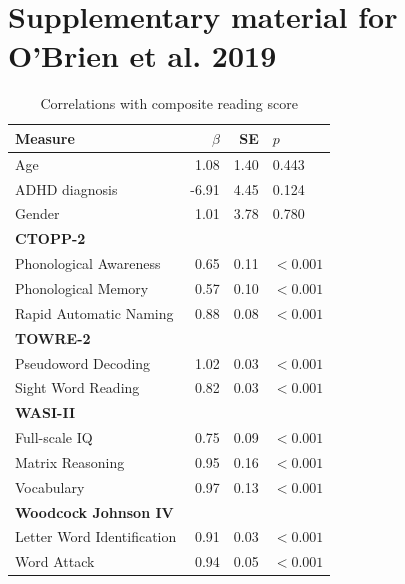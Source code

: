 \documentclass[..\uwthesis.tex]{subfiles}
\begin{document}
\chapter{Supplementary material for O'Brien et al. 2019}

\begin{table}
\centering
\caption{Correlations with composite reading score}
\label{tab:sb_rdcorr}
    \begin{tabular}{lrrl}
    \toprule
     Measure & $\beta$ & SE & $p$\\
    \midrule
    Age                & 1.08 & 1.40 & 0.443\\
    ADHD diagnosis     & -6.91 & 4.45 & 0.124\\
    Gender             & 1.01 & 3.78 & 0.780\\
    \textbf{CTOPP-2} &  &  &  \\
    Phonological Awareness & 0.65 & 0.11 & $< 0.001$\\
    Phonological Memory &0.57 & 0.10 & $< 0.001$\\
    Rapid Automatic Naming & 0.88 & 0.08 & $< 0.001$\\
    \textbf{TOWRE-2} & & & \\
    Pseudoword Decoding & 1.02 & 0.03 & $< 0.001$\\
    Sight Word Reading & 0.82 & 0.03 & $< 0.001$\\
    \textbf{WASI-II} & & & \\
    Full-scale IQ & 0.75 & 0.09 & $< 0.001$\\
    Matrix Reasoning & 0.95 & 0.16 & $< 0.001$\\
    Vocabulary & 0.97 & 0.13 & $< 0.001$\\
    \textbf{Woodcock Johnson IV} & & & \\
    Letter Word Identification & 0.91 & 0.03 & $< 0.001$\\
    Word Attack & 0.94 & 0.05 & $< 0.001$\\
     
    \bottomrule
    \end{tabular}
\end{table}
\end{document}
